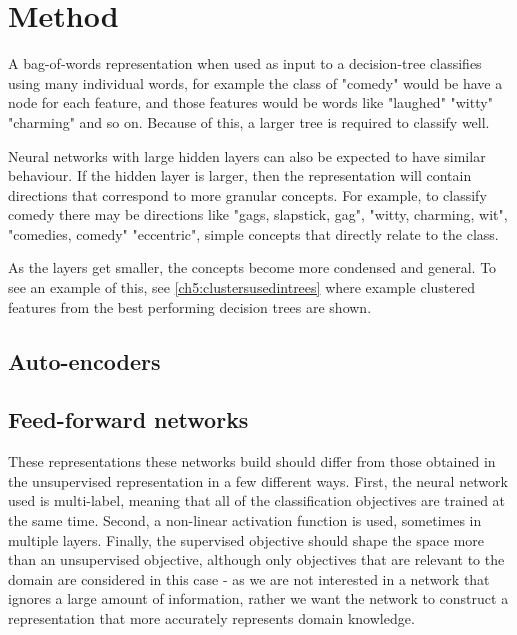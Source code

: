

\section{Method}

A bag-of-words representation when used as input to a decision-tree classifies using many individual words, for example the class of "comedy" would be have a node for each feature, and those features would be words like "laughed" "witty" "charming" and so on. Because of this, a larger tree is required to classify well. 

Neural networks with large hidden layers can also be expected to have similar behaviour. If the hidden layer is larger, then the representation will contain directions that correspond to more granular concepts. For example, to classify comedy there may be directions like "gags, slapstick, gag", "witty, charming, wit", "comedies, comedy" "eccentric", simple concepts that directly relate to the class.

As the layers get smaller, the concepts become more condensed and general. To see an example of this, see \ref{ch5:clustersusedintrees} where example clustered features from the best performing decision trees are shown.




\subsection{Auto-encoders}


\subsection{Feed-forward networks}

These representations these networks build should differ from those obtained in the unsupervised representation in a few different ways. First, the neural network used is multi-label, meaning that all of the classification objectives are trained at the same time. Second, a non-linear activation function is used, sometimes in multiple layers. Finally, the supervised objective should shape the space more than an unsupervised objective, although only objectives that are relevant to the domain are considered in this case - as we are not interested in a network that ignores a large amount of information, rather we want the network to construct a representation that more accurately represents domain knowledge.

